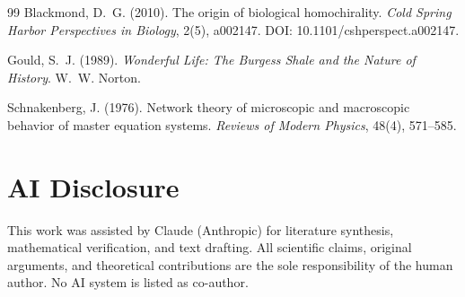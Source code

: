 \documentclass[12pt,a4paper]{article}
\theoremstyle{remark}
\begin{document}
\begin{thebibliography}{99}
Blackmond, D.~G. (2010).
\newblock The origin of biological homochirality.
\newblock \textit{Cold Spring Harbor Perspectives in Biology}, 2(5), a002147.
\newblock DOI: 10.1101/cshperspect.a002147.

Gould, S.~J. (1989).
\newblock \textit{Wonderful Life: The Burgess Shale and the Nature of History}.
\newblock W.~W. Norton.

Schnakenberg, J. (1976).
\newblock Network theory of microscopic and macroscopic behavior of master equation systems.
\newblock \textit{Reviews of Modern Physics}, 48(4), 571--585.

\end{thebibliography}

\section*{AI Disclosure}
This work was assisted by Claude (Anthropic) for literature synthesis, mathematical verification, and text drafting. All scientific claims, original arguments, and theoretical contributions are the sole responsibility of the human author. No AI system is listed as co-author.
\end{document}
